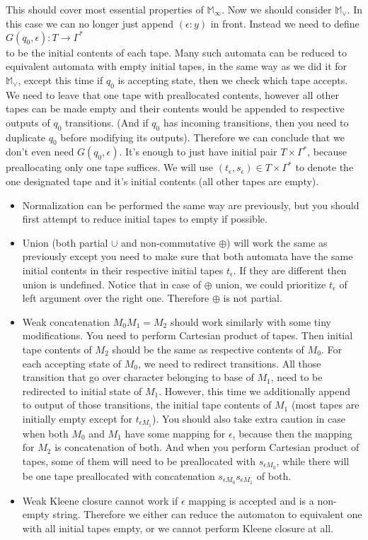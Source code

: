 \documentclass[12pt]{article}
\begin{document}
This should cover most essential properties of $\mathbb{ M}_\infty$. Now we should consider $\mathbb{ M}_\vee$.  In this case we can no longer just append $(\epsilon:y)$ in front. Instead we need to define \\
$G(q_0,\epsilon) : T \rightarrow \Gamma^*$ \\
to be the initial contents of each tape. Many such  automata can be reduced to equivalent automata with empty initial tapes, in the same way as we did it for $\mathbb{ M}_\vee$, except this time if $q_0$ is accepting state, then we check which tape accepts. We need to leave that one tape with preallocated contents, however all other tapes can be made empty and their contents would be appended to respective outputs of $q_0$ transitions. (And if $q_0$ has incoming transitions, then you need to duplicate $q_0$ before modifying its outputs). Therefore we can conclude that we don't even need $G(q_0,\epsilon)$. It's enough to just have initial pair $T \times \Gamma^*$, because preallocating only one tape suffices. We will use $(t_\epsilon,s_\epsilon) \in T \times \Gamma^*$ to denote the one designated  tape and it's initial contents (all other tapes are empty). 
\begin{itemize}
	\item Normalization can be performed the same way are previously, but you should first attempt to reduce initial tapes to empty if possible.
	\item Union (both partial $\cup$ and non-commutative $\oplus$) will work the same as previously except you need to make sure that both automata have the same initial contents in their respective initial tapes $t_\epsilon$. If they are different then union is undefined. Notice that in case of $\oplus$ union, we could prioritize $t_\epsilon$ of left argument over the right one. Therefore $\oplus$ is not partial.
	\item Weak concatenation $M_0 M_1 = M_2$ should work similarly with some tiny modifications. You need to perform Cartesian product of tapes. Then initial tape contents of $M_2$ should be the same as respective contents of $M_0$. For each accepting state of $M_0$, we need to redirect transitions. All those transition that go over character belonging to base of $M_1$,  need to be redirected to initial state of $M_1$. However, this time we additionally append to output of those transitions, the initial tape contents of  $M_1$ (most tapes are initially empty except for $t_{\epsilon M_1}$). You should also take extra caution in case when both $M_0$ and $M_1$ have some mapping for  $\epsilon$, because then the mapping for $M_2$ is concatenation of both. And when you perform Cartesian  product of tapes, some of them will need to be preallocated with $s_{\epsilon M_0}$, while there will be one tape preallocated with concatenation $s_{\epsilon M_0}s_{\epsilon M_1}$ of both.
	\item Weak Kleene closure cannot work if $\epsilon$ mapping is accepted and is a non-empty string. Therefore we either can reduce the automaton to equivalent one with all initial tapes empty, or we cannot perform Kleene closure at all.
	
\end{itemize}
\end{document}
